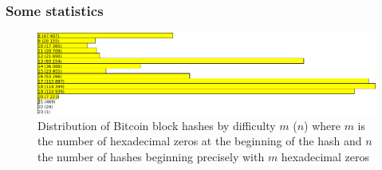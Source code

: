 \documentclass{beamer}
\begin{document}
\begin{frame}

\frametitle{Some statistics}

\begin{figure}[H]
		\includegraphics[width=\linewidth]{illustrations/hexaHashesStats.png}
		\caption{Distribution of Bitcoin block hashes by difficulty $m$ ($n$) where $m$ is the number of hexadecimal zeros at the beginning of the hash and $n$ the number of hashes beginning precisely with $m$ hexadecimal zeros}
	\end{figure}

\end{frame}
\end{document}
